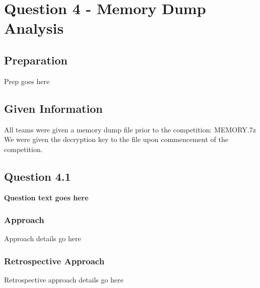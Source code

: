 \chapter{Question 4 - Memory Dump Analysis}

\section{Preparation}
Prep goes here

\section{Given Information}
All teams were given a memory dump file prior to the competition: MEMORY.7z\\
We were given the decryption key to the file upon commencement of the
competition.

\section{Question 4.1}
\textbf{Question text goes here}
\subsection{Approach}
Approach details go here
\subsection{Retrospective Approach}
Retrospective approach details go here
